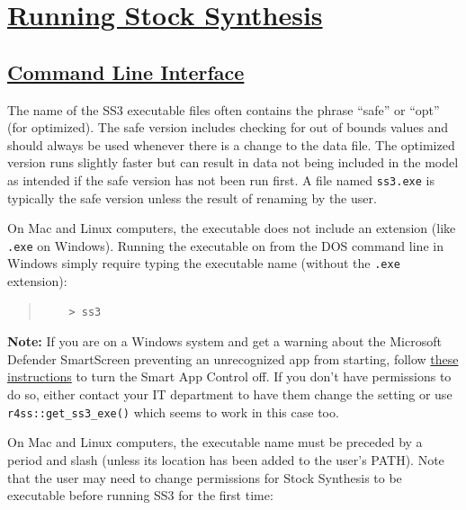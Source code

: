 \section[Running Stock Synthesis]{\protect\hyperref[sec:RunningSS3]{Running Stock Synthesis}} \label{sec:RunningSS3}

\hypertarget{CommandLine}{}
\subsection[Command Line Interface]{\protect\hyperlink{CommandLine}{Command Line Interface}}
The name of the SS3 executable files often contains the phrase ``safe'' or ``opt'' (for optimized). The safe version includes checking for out of bounds values and should always be used whenever there is a change to the data file. The optimized version runs slightly faster but can result in data not being included in the model as intended if the safe version has not been run first. A file named \texttt{ss3.exe} is typically the safe version unless the result of renaming by the user.

On Mac and Linux computers, the executable does not include an extension (like \texttt{.exe} on Windows).
Running the executable on from the DOS command line in Windows simply require typing the executable name (without the \texttt{.exe} extension):
\begin{quote}
	\begin{verbatim}
	> ss3
	\end{verbatim}
\end{quote}

\textbf{Note:}
If you are on a Windows system and get a warning about the Microsoft Defender SmartScreen preventing an unrecognized app from starting, follow \href{https://answers.microsoft.com/en-us/windows/forum/all/how-to-change-the-mode-of-smart-app-control-from/399a276f-5585-40fe-b72d-c014cac82b32}{these instructions} to turn the Smart App Control off. If you don't have permissions to do so, either contact your IT department to have them change the setting or use \texttt{r4ss::get\_ss3\_exe()} which seems to work in this case too.

On Mac and Linux computers, the executable name must be preceded by a period and slash (unless its location has been added to the user's PATH). Note that the user may need to change permissions for Stock Synthesis to be executable before running SS3 for the first time:

